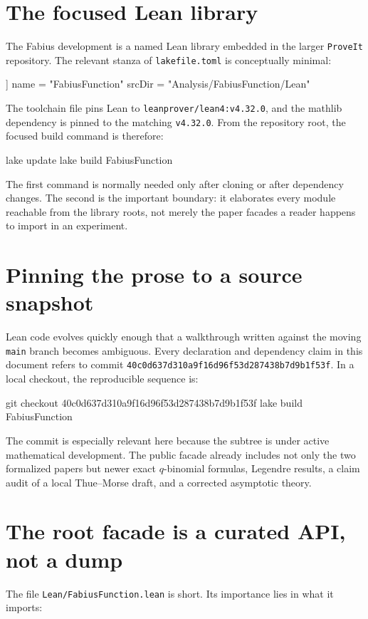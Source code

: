 \documentclass[11pt,a4paper,openany]{book}
\newcommand{\commit}{\nolinkurl{40c0d637d310a9f16d96f53d287438b7d9b1f53f}}
\newcommand{\pathbreak}[1]{\nolinkurl{#1}}
\begin{document}
\section{The focused Lean library}
The Fabius development is a named Lean library embedded in the larger
\texttt{ProveIt} repository.  The relevant stanza of \pathbreak{lakefile.toml}
is conceptually minimal:

\begin{LeanCode}
[[lean_lib]]
name = "FabiusFunction"
srcDir = "Analysis/FabiusFunction/Lean"
\end{LeanCode}

The toolchain file pins Lean to \texttt{leanprover/lean4:v4.32.0}, and the
mathlib dependency is pinned to the matching \texttt{v4.32.0}.  From the
repository root, the focused build command is therefore:

\begin{ShellCode}
lake update
lake build FabiusFunction
\end{ShellCode}

The first command is normally needed only after cloning or after dependency
changes.  The second is the important boundary: it elaborates every module
reachable from the library roots, not merely the paper facades a reader happens
to import in an experiment.

\section{Pinning the prose to a source snapshot}
Lean code evolves quickly enough that a walkthrough written against the moving
\texttt{main} branch becomes ambiguous.  Every declaration and dependency
claim in this document refers to commit \commit.  In a local checkout, the
reproducible sequence is:

\begin{ShellCode}
git checkout 40c0d637d310a9f16d96f53d287438b7d9b1f53f
lake build FabiusFunction
\end{ShellCode}

The commit is especially relevant here because the subtree is under active
mathematical development.  The public facade already includes not only the two
formalized papers but newer exact $q$-binomial formulas, Legendre results, a
claim audit of a local Thue--Morse draft, and a corrected asymptotic theory.

\section{The root facade is a curated API, not a dump}
The file \pathbreak{Lean/FabiusFunction.lean} is short.  Its importance lies in
what it imports:
\end{document}
